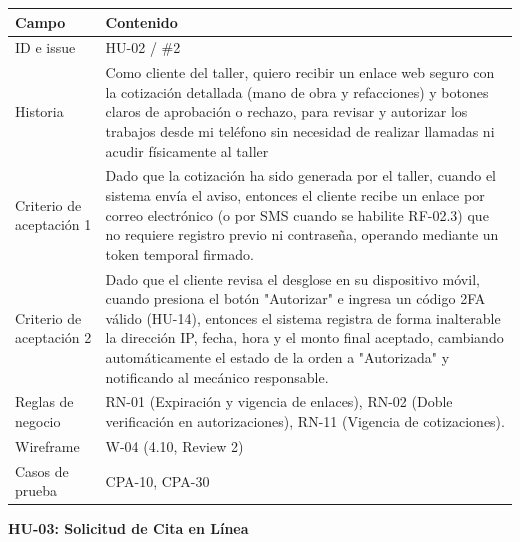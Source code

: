 {\def\LTcaptype{none} %
\begin{longtable}[]{@{}
  >{\raggedright\arraybackslash}p{}
  >{\raggedright\arraybackslash}p{}@{}}
\toprule\noalign{}
\begin{minipage}[b]{\linewidth}\raggedright
\textbf{Campo}
\end{minipage} & \begin{minipage}[b]{\linewidth}\raggedright
\textbf{Contenido}
\end{minipage} \\
\midrule\noalign{}
\endhead
\bottomrule\noalign{}
\endlastfoot
ID e issue & HU-02 / \#2 \\
Historia & Como cliente del taller, quiero recibir un enlace web seguro
con la cotización detallada (mano de obra y refacciones) y botones
claros de aprobación o rechazo, para revisar y autorizar los trabajos
desde mi teléfono sin necesidad de realizar llamadas ni acudir
físicamente al taller \\
Criterio de aceptación 1 & Dado que la cotización ha sido generada por
el taller, cuando el sistema envía el aviso, entonces el cliente recibe
un enlace por correo electrónico (o por SMS cuando se habilite RF-02.3)
que no requiere registro previo ni contraseña, operando mediante un
token temporal firmado. \\
Criterio de aceptación 2 & Dado que el cliente revisa el desglose en su
dispositivo móvil, cuando presiona el botón "Autorizar" e ingresa un
código 2FA válido (HU-14), entonces el sistema registra de forma
inalterable la dirección IP, fecha, hora y el monto final aceptado,
cambiando automáticamente el estado de la orden a "Autorizada" y
notificando al mecánico responsable. \\
Reglas de negocio & RN-01 (Expiración y vigencia de enlaces), RN-02
(Doble verificación en autorizaciones), RN-11 (Vigencia de
cotizaciones). \\
Wireframe & W-04 (4.10, Review 2) \\
Casos de prueba & CPA-10, CPA-30 \\
\end{longtable}
}

\textbf{HU-03: Solicitud de Cita en Línea}

